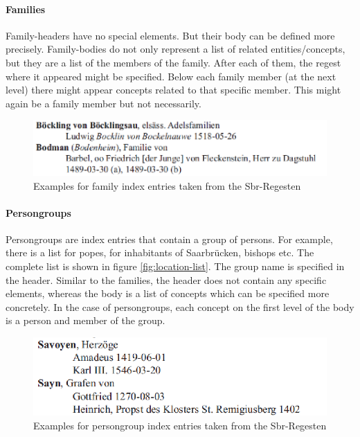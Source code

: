 \paragraph{Families}
Family-headers have no special elements. But their body can be defined more precisely. Family-bodies do not only represent a list of related entities/concepts, but they are a list of the members of the family. After each of them, the regest where it appeared might be specified. Below each family member (at the next level) there might appear concepts related to that specific member. This might again be a family member but not necessarily.

\begin{figure}[h]
  \centering
  \includegraphics[scale=0.45]{img/family-example}
  \caption{Examples for family index entries taken from the Sbr-Regesten}
  \label{fig:family-example}
\end{figure}

\paragraph{Persongroups}
Persongroups are index entries that contain a group of persons. For example, there is a list for popes, for inhabitants of Saarbrücken, bishops etc. The complete list is shown in figure \ref{fig:location-list}. The group name is specified in the header. Similar to the families, the header does not contain any specific elements, whereas the body is a list of concepts which can be specified more concretely. In the case of persongroups, each concept on the first level of the body is a person and member of the group. %

\begin{figure}[h]
  \centering
  \includegraphics[scale=0.45]{img/persongroup-example}
  \caption{Examples for persongroup index entries taken from the Sbr-Regesten}
  \label{fig:persongroup-example}
\end{figure}

